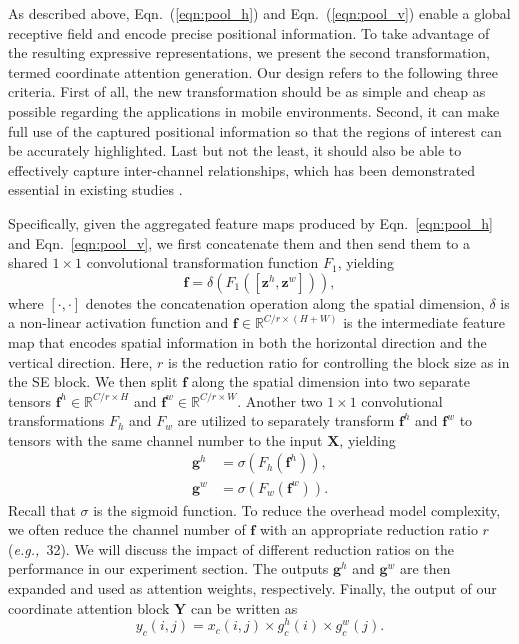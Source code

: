\documentclass[final]{cvpr}
\def\eg{\emph{e.g.,~}}
\begin{document}
As described above, Eqn.~(\ref{eqn:pool_h}) and Eqn.~(\ref{eqn:pool_v}) enable a global receptive field and encode precise positional information.
%
To take advantage of the resulting expressive representations, we present the second transformation, termed 
coordinate attention generation.
%
Our design refers to the following three criteria.
%
First of all, the new transformation should be as simple and cheap
as possible regarding the applications in mobile environments.
%
Second, it can make full use of the captured positional information so that the regions of interest can be accurately highlighted.
%
Last but not the least, it should also be able to effectively capture inter-channel relationships, which has been demonstrated essential in existing studies \cite{hu2018squeeze,woo2018cbam}.
%



Specifically, given the aggregated feature maps produced by Eqn.~\ref{eqn:pool_h} and Eqn.~\ref{eqn:pool_v},
we first concatenate them and then send them to a shared $1\times1$ convolutional transformation function $F_1$,
yielding
\begin{equation} \label{eqn:transformation_1}
\mathbf{f} = \delta(F_1([\mathbf{z}^h, \mathbf{z}^w])),
\end{equation}
where $[\cdot,\cdot]$ denotes the concatenation operation along the spatial dimension, $\delta$ is a non-linear activation function and $\mathbf{f}\in \mathbb{R}^{C/r \times (H + W)}$ is the intermediate feature map that encodes spatial information in both the horizontal direction and the vertical direction.
%
Here, $r$ is the reduction ratio for controlling the block size as in the SE block.
%
We then split $\mathbf{f}$ along the spatial dimension into two separate tensors $\mathbf{f}^h\in \mathbb{R}^{C/r \times H}$ and $\mathbf{f}^w\in \mathbb{R}^{C/r \times W}$.
%
Another two $1\times1$ convolutional transformations $F_h$ and $F_w$ are utilized to separately transform
$\mathbf{f}^h$ and $\mathbf{f}^w$ to tensors with the same channel number to the input $\mathbf{X}$, yielding
\begin{align} \label{eqn:transformation_2}
\mathbf{g}^h &= \sigma(F_h(\mathbf{f}^h)), \\
\mathbf{g}^w &= \sigma(F_w(\mathbf{f}^w)).
\end{align}
Recall that $\sigma$ is the sigmoid function.
%
To reduce the overhead model complexity, we often reduce the channel number of $\mathbf{f}$ with an appropriate reduction ratio $r$ (\eg 32).
%
We will discuss the impact of different reduction ratios on the performance in our experiment section.
%
The outputs $\mathbf{g}^h$ and $\mathbf{g}^w$ are then
expanded and used as attention weights, respectively.
%
Finally, the output of our coordinate attention block $\mathbf{Y}$ can be written as
\begin{equation} \label{eqn:attention}
y_c(i, j) = x_c(i, j) \times g_c^h(i) \times g_c^w(j).
\end{equation}
\end{document}
